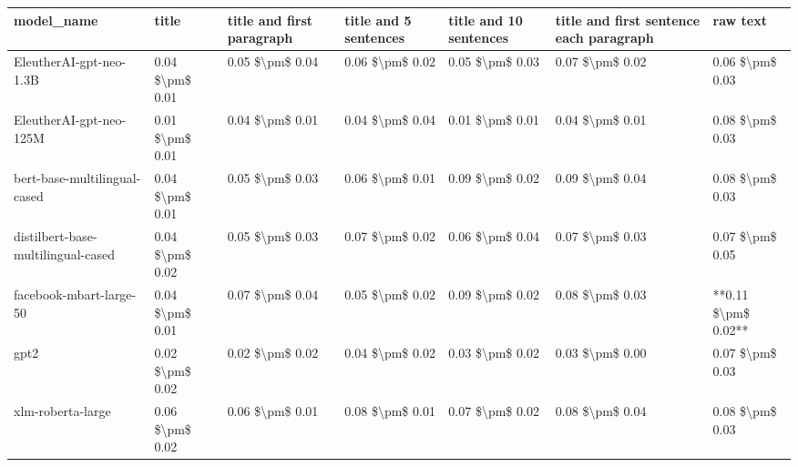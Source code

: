 \begin{tabular}{lllllll}
\toprule
                        model\_name &           title & title and first paragraph & title and 5 sentences & title and 10 sentences & title and first sentence each paragraph &            raw text \\
\midrule
           EleutherAI-gpt-neo-1.3B & 0.04 \$\textbackslash pm\$ 0.01 &           0.05 \$\textbackslash pm\$ 0.04 &       0.06 \$\textbackslash pm\$ 0.02 &        0.05 \$\textbackslash pm\$ 0.03 &                         0.07 \$\textbackslash pm\$ 0.02 &     0.06 \$\textbackslash pm\$ 0.03 \\
           EleutherAI-gpt-neo-125M & 0.01 \$\textbackslash pm\$ 0.01 &           0.04 \$\textbackslash pm\$ 0.01 &       0.04 \$\textbackslash pm\$ 0.04 &        0.01 \$\textbackslash pm\$ 0.01 &                         0.04 \$\textbackslash pm\$ 0.01 &     0.08 \$\textbackslash pm\$ 0.03 \\
      bert-base-multilingual-cased & 0.04 \$\textbackslash pm\$ 0.01 &           0.05 \$\textbackslash pm\$ 0.03 &       0.06 \$\textbackslash pm\$ 0.01 &        0.09 \$\textbackslash pm\$ 0.02 &                         0.09 \$\textbackslash pm\$ 0.04 &     0.08 \$\textbackslash pm\$ 0.03 \\
distilbert-base-multilingual-cased & 0.04 \$\textbackslash pm\$ 0.02 &           0.05 \$\textbackslash pm\$ 0.03 &       0.07 \$\textbackslash pm\$ 0.02 &        0.06 \$\textbackslash pm\$ 0.04 &                         0.07 \$\textbackslash pm\$ 0.03 &     0.07 \$\textbackslash pm\$ 0.05 \\
           facebook-mbart-large-50 & 0.04 \$\textbackslash pm\$ 0.01 &           0.07 \$\textbackslash pm\$ 0.04 &       0.05 \$\textbackslash pm\$ 0.02 &        0.09 \$\textbackslash pm\$ 0.02 &                         0.08 \$\textbackslash pm\$ 0.03 & **0.11 \$\textbackslash pm\$ 0.02** \\
                              gpt2 & 0.02 \$\textbackslash pm\$ 0.02 &           0.02 \$\textbackslash pm\$ 0.02 &       0.04 \$\textbackslash pm\$ 0.02 &        0.03 \$\textbackslash pm\$ 0.02 &                         0.03 \$\textbackslash pm\$ 0.00 &     0.07 \$\textbackslash pm\$ 0.03 \\
                 xlm-roberta-large & 0.06 \$\textbackslash pm\$ 0.02 &           0.06 \$\textbackslash pm\$ 0.01 &       0.08 \$\textbackslash pm\$ 0.01 &        0.07 \$\textbackslash pm\$ 0.02 &                         0.08 \$\textbackslash pm\$ 0.04 &     0.08 \$\textbackslash pm\$ 0.03 \\
\bottomrule
\end{tabular}
